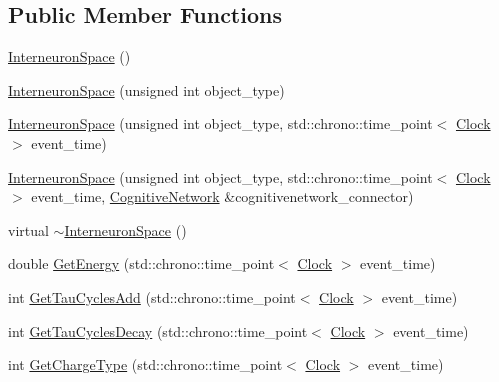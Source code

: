 \subsection*{Public Member Functions}
\begin{DoxyCompactItemize}
\item 
\mbox{\hyperlink{classInterneuronSpace_a4ad439037f087e7d5cb3e1d8c581ee5f}{Interneuron\+Space}} ()
\item 
\mbox{\hyperlink{classInterneuronSpace_a18d5d4920073a9a93ee3cb8f5efe9211}{Interneuron\+Space}} (unsigned int object\+\_\+type)
\item 
\mbox{\hyperlink{classInterneuronSpace_a753903f3c74415922607846040ac50a6}{Interneuron\+Space}} (unsigned int object\+\_\+type, std\+::chrono\+::time\+\_\+point$<$ \mbox{\hyperlink{universe_8h_a0ef8d951d1ca5ab3cfaf7ab4c7a6fd80}{Clock}} $>$ event\+\_\+time)
\item 
\mbox{\hyperlink{classInterneuronSpace_aa87eb8c7186542989fccdadc594c5915}{Interneuron\+Space}} (unsigned int object\+\_\+type, std\+::chrono\+::time\+\_\+point$<$ \mbox{\hyperlink{universe_8h_a0ef8d951d1ca5ab3cfaf7ab4c7a6fd80}{Clock}} $>$ event\+\_\+time, \mbox{\hyperlink{classCognitiveNetwork}{Cognitive\+Network}} \&cognitivenetwork\+\_\+connector)
\item 
virtual \mbox{\hyperlink{classInterneuronSpace_aff0056e3c60b7eff3ad4ca12f6756628}{$\sim$\+Interneuron\+Space}} ()
\item 
double \mbox{\hyperlink{classInterneuronSpace_a677430712211956219767d4fa71d20e6}{Get\+Energy}} (std\+::chrono\+::time\+\_\+point$<$ \mbox{\hyperlink{universe_8h_a0ef8d951d1ca5ab3cfaf7ab4c7a6fd80}{Clock}} $>$ event\+\_\+time)
\item 
int \mbox{\hyperlink{classInterneuronSpace_abd37d409a97acca62d11576314bdfcf4}{Get\+Tau\+Cycles\+Add}} (std\+::chrono\+::time\+\_\+point$<$ \mbox{\hyperlink{universe_8h_a0ef8d951d1ca5ab3cfaf7ab4c7a6fd80}{Clock}} $>$ event\+\_\+time)
\item 
int \mbox{\hyperlink{classInterneuronSpace_a1024eadca0b56be9b54593ea47c5879f}{Get\+Tau\+Cycles\+Decay}} (std\+::chrono\+::time\+\_\+point$<$ \mbox{\hyperlink{universe_8h_a0ef8d951d1ca5ab3cfaf7ab4c7a6fd80}{Clock}} $>$ event\+\_\+time)
\item 
int \mbox{\hyperlink{classInterneuronSpace_a90a2c950dd426ed3f015e3c186e877fd}{Get\+Charge\+Type}} (std\+::chrono\+::time\+\_\+point$<$ \mbox{\hyperlink{universe_8h_a0ef8d951d1ca5ab3cfaf7ab4c7a6fd80}{Clock}} $>$ event\+\_\+time)
\item 

\end{DoxyCompactItemize}
